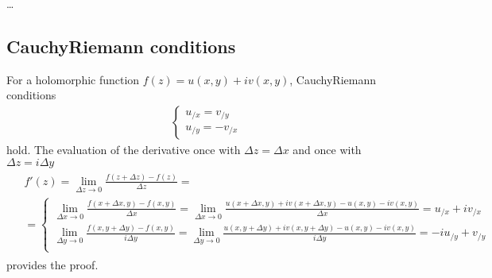 \documentclass[letterpaper,10pt,english]{jupyterBook}
\begin{document}
\sphinxAtStartPar
{} …


\subsection{Cauchy\sphinxhyphen{}Riemann conditions}
\label{\detokenize{ch/complex/analysis:cauchy-riemann-conditions}}\label{\detokenize{ch/complex/analysis:complex-analysis-holo-fun-cauchy-riemann}}
\sphinxAtStartPar
For a holomorphic function \(f(z) = u(x,y) + i v(x,y)\), Cauchy\sphinxhyphen{}Riemann conditions
\begin{equation*}
\begin{split}\begin{cases}
u_{/x} = v_{/y} \\
u_{/y} = - v_{/x}
\end{cases}\end{split}
\end{equation*}
\sphinxAtStartPar
hold. The evaluation of the derivative once with \(\Delta z = \Delta x\) and once with \(\Delta z = i \Delta y\)
\begin{equation*}
\begin{split}\begin{aligned}
& f'(z) = \lim_{\Delta z \rightarrow 0} \frac{f(z+\Delta z) - f(z)}{\Delta z} = \\ 
& = \left\{
\begin{aligned}
  \lim_{\Delta x \rightarrow 0} \frac{f(x+\Delta x,y) - f(x,y)}{\Delta x} = \lim_{\Delta x \rightarrow 0} \frac{u(x+\Delta x,y) + i v(x+\Delta x,y) - u(x,y) - i v(x,y)}{\Delta x} = u_{/x} + i v_{/x} \\ 
  \lim_{\Delta y \rightarrow 0} \frac{f(x,y+\Delta y) - f(x,y)}{i \Delta y} = \lim_{\Delta y \rightarrow 0}  \frac{u(x,y+\Delta y) + i v(x,y+\Delta y) - u(x,y) - i v(x,y)}{i \Delta y} = -i u_{/y} + v_{/y} \\ 
\end{aligned}
\right.
\end{aligned}\end{split}
\end{equation*}
\sphinxAtStartPar
provides the proof.
\end{document}
